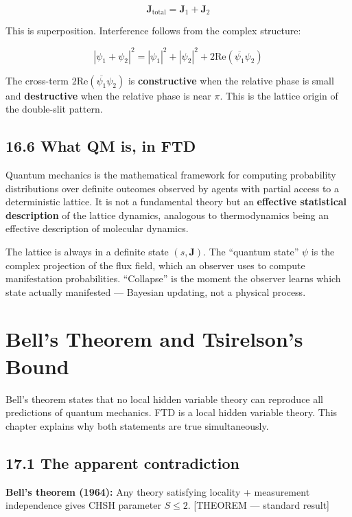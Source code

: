 \documentclass[
  11pt,
  letterpaper,
  twoside,
  openright]{book}
\begin{document}
\[
\mathbf{J}_{\text{total}} = \mathbf{J}_1 + \mathbf{J}_2
\tag{16.5}
\]

This is superposition. Interference follows from the complex structure:

\[
|\psi_1 + \psi_2|^2 = |\psi_1|^2 + |\psi_2|^2 + 2\text{Re}(\overline{\psi_1}\psi_2)
\tag{16.6}
\]

The cross-term \(2\text{Re}(\overline{\psi_1}\psi_2)\) is
\textbf{constructive} when the relative phase is small and
\textbf{destructive} when the relative phase is near \(\pi\). This is
the lattice origin of the double-slit pattern.

\section{16.6 What QM is, in FTD}\label{what-qm-is-in-ftd}

Quantum mechanics is the mathematical framework for computing
probability distributions over definite outcomes observed by agents with
partial access to a deterministic lattice. It is not a fundamental
theory but an \textbf{effective statistical description} of the lattice
dynamics, analogous to thermodynamics being an effective description of
molecular dynamics.

The lattice is always in a definite state \((s, \mathbf{J})\). The
``quantum state'' \(\psi\) is the complex projection of the flux field,
which an observer uses to compute manifestation probabilities.
``Collapse'' is the moment the observer learns which state actually
manifested --- Bayesian updating, not a physical process.

\chapter{Bell's Theorem and Tsirelson's Bound}\label{sec-bell}

Bell's theorem states that no local hidden variable theory can reproduce
all predictions of quantum mechanics. FTD is a local hidden variable
theory. This chapter explains why both statements are true
simultaneously.

\section{17.1 The apparent
contradiction}\label{the-apparent-contradiction}

\textbf{Bell's theorem (1964):} Any theory satisfying locality +
measurement independence gives CHSH parameter \(S \leq 2\). {[}THEOREM
--- standard result{]}
\end{document}
